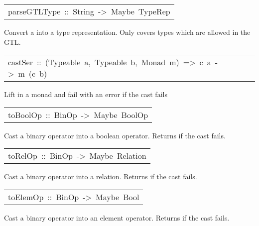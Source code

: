 \begin{haddockdesc}
\item[\begin{tabular}{@{}l}
parseGTLType\ ::\ String\ ->\ Maybe\ TypeRep
\end{tabular}]\haddockbegindoc
Convert a  into a type representation. Only covers types which are allowed in the GTL.
\par

\end{haddockdesc}
\begin{haddockdesc}
\item[\begin{tabular}{@{}l}
castSer\ ::\ (Typeable\ a,\ Typeable\ b,\ Monad\ m)\ =>\ c\ a\ ->\ m\ (c\ b)
\end{tabular}]\haddockbegindoc
Lift  in a monad and fail with an error if the cast fails
\par

\end{haddockdesc}
\begin{haddockdesc}
\item[\begin{tabular}{@{}l}
toBoolOp\ ::\ BinOp\ ->\ Maybe\ BoolOp
\end{tabular}]\haddockbegindoc
Cast a binary operator into a boolean operator. Returns  if the cast fails.
\par

\end{haddockdesc}
\begin{haddockdesc}
\item[\begin{tabular}{@{}l}
toRelOp\ ::\ BinOp\ ->\ Maybe\ Relation
\end{tabular}]\haddockbegindoc
Cast a binary operator into a relation. Returns  if the cast fails.
\par

\end{haddockdesc}
\begin{haddockdesc}
\item[\begin{tabular}{@{}l}
toElemOp\ ::\ BinOp\ ->\ Maybe\ Bool
\end{tabular}]\haddockbegindoc
Cast a binary operator into an element operator. Returns  if the cast fails.
\par

\end{haddockdesc}
